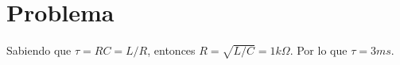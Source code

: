 \section*{Problema}

Sabiendo que $\tau = RC = L/R$, entonces $R = \sqrt{L/C} = \boxed{ 1k\Omega }$. Por lo que $\boxed{\tau = 3ms}$.




